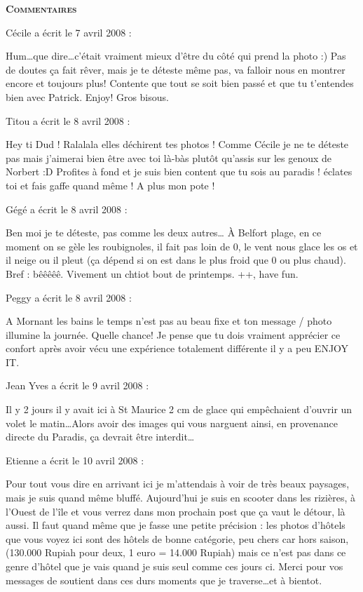 \bigskip
\textbf{\textsc{Commentaires}}

\medskip
Cécile a écrit le 7 avril 2008 :
\begin{displayquote}
Hum\dots que dire\dots c'était vraiment mieux d'être du côté qui prend la photo :) Pas de doutes ça fait rêver, mais je te déteste même pas, va falloir nous en montrer encore et toujours plus!
Contente que tout se soit bien passé et que tu t'entendes bien avec Patrick. Enjoy!
Gros bisous.
\end{displayquote}

\medskip
Titou a écrit le 8 avril 2008 :
\begin{displayquote}
Hey ti Dud !
Ralalala elles déchirent tes photos ! Comme Cécile je ne te déteste pas mais j'aimerai bien être avec toi là-bàs plutôt qu'assis sur les genoux de Norbert :D
Profites à fond et je suis bien content que tu sois au paradis ! éclates toi et fais gaffe quand même !
A plus mon pote !
\end{displayquote}

\medskip
Gégé a écrit le 8 avril 2008 :
\begin{displayquote}
Ben moi je te déteste, pas comme les deux autres\dots
À Belfort plage, en ce moment on se gèle les roubignoles, il fait pas loin de 0, le vent nous glace les os et il neige ou il pleut (ça dépend si on est dans le plus froid que 0 ou plus chaud). Bref : bêêêêê.
Vivement un chtiot bout de printemps.
++, have fun.
\end{displayquote}

\medskip
Peggy a écrit le 8 avril 2008 :
\begin{displayquote}
A Mornant les bains le temps n'est pas au beau fixe et ton message / photo illumine la journée.
Quelle chance!
Je pense que tu dois vraiment apprécier ce confort après avoir vécu une expérience totalement différente il y a peu
ENJOY IT.
\end{displayquote}

\medskip
Jean Yves a écrit le 9 avril 2008 :
\begin{displayquote}
Il y 2 jours il y avait ici à St Maurice 2 cm de glace qui empêchaient d'ouvrir un volet le matin\dots Alors avoir des images qui vous narguent ainsi, en provenance directe du Paradis, ça devrait être interdit\dots
\end{displayquote}

\medskip
Etienne a écrit le 10 avril 2008 :
\begin{displayquote}
Pour tout vous dire en arrivant ici je m'attendais à voir de très beaux paysages, mais je suis quand même bluffé.
Aujourd'hui je suis en scooter dans les rizières, à l'Ouest de l'île et vous verrez dans mon prochain post que ça vaut le détour, là aussi.
Il faut quand même que je fasse une petite précision : les photos d'hôtels que vous voyez ici sont des hôtels de bonne catégorie, peu chers car hors saison, (130.000 Rupiah pour deux, 1 euro = 14.000 Rupiah) mais ce n'est pas dans ce genre d'hôtel que je vais quand je suis seul comme ces jours ci.
Merci pour vos messages de soutient dans ces durs moments que je traverse\dots et à bientot.
\end{displayquote}

